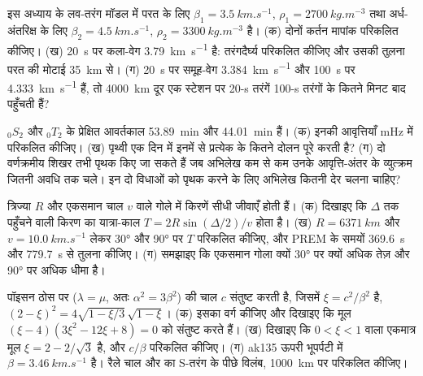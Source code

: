 \begin{exercise}[$\star$]\label{exo:b3:seismology-imaging:3}
इस अध्याय के लव-तरंग मॉडल में परत के लिए $\beta_1 =
\qty{3.5}{km.s^{-1}}$, $\rho_1 = \qty{2700}{kg.m^{-3}}$ तथा अर्ध-अंतरिक्ष के लिए
$\beta_2 = \qty{4.5}{km.s^{-1}}$, $\rho_2 = \qty{3300}{kg.m^{-3}}$ है।
(क) दोनों कर्तन मापांक परिकलित कीजिए। (ख) \qty{20}{s} पर कला-वेग
\qty{3.79}{km.s^{-1}} है: तरंगदैर्घ्य परिकलित कीजिए और उसकी तुलना परत की
मोटाई \qty{35}{km} से। (ग) \qty{20}{s} पर समूह-वेग \qty{3.384}{km.s^{-1}} और
\qty{100}{s} पर \qty{4.333}{km.s^{-1}} हैं, तो \qty{4000}{km} दूर एक स्टेशन पर
20-s तरंगें 100-s तरंगों के कितने मिनट बाद पहुँचती हैं?
\end{exercise}

\begin{exercise}[$\star$]\label{exo:b3:seismology-imaging:4}
${}_0S_2$ और ${}_0T_2$ के प्रेक्षित आवर्तकाल \qty{53.89}{min} और
\qty{44.01}{min} हैं। (क) इनकी आवृत्तियाँ \unit{mHz} में परिकलित कीजिए। (ख) पृथ्वी
एक दिन में इनमें से प्रत्येक के कितने दोलन पूरे करती है? (ग) दो वर्णक्रमीय शिखर
तभी पृथक किए जा सकते हैं जब अभिलेख कम से कम उनके आवृत्ति-अंतर के व्युत्क्रम
जितनी अवधि तक चले। इन दो विधाओं को पृथक करने के लिए अभिलेख कितनी देर चलना चाहिए?
\end{exercise}

\begin{exercise}[$\star\star$]\label{exo:b3:seismology-imaging:5}
त्रिज्या $R$ और एकसमान चाल $v$ वाले गोले में किरणें सीधी जीवाएँ होती हैं।
(क) दिखाइए कि $\Delta$ तक पहुँचने वाली किरण का यात्रा-काल
$T = 2R\sin(\Delta/2)/v$ होता है। (ख) $R = \qty{6371}{km}$ और
$v = \qty{10.0}{km.s^{-1}}$ लेकर \ang{30} और \ang{90} पर $T$ परिकलित कीजिए, और
PREM के समयों \qty{369.6}{s} और \qty{779.7}{s} से तुलना कीजिए। (ग) समझाइए कि एकसमान गोला क्यों
\ang{30} पर क्यों अधिक तेज़ और \ang{90} पर अधिक धीमा है।
\end{exercise}

\begin{exercise}[$\star\star$]\label{exo:b3:seismology-imaging:6}
पॉइसन ठोस पर ($\lambda = \mu$, अतः $\alpha^2 = 3\beta^2$) 
की चाल $c$ संतुष्ट करती है, जिसमें $\xi = c^2/\beta^2$ है,
$(2 - \xi)^2 = 4\sqrt{1 - \xi/3}\,\sqrt{1 - \xi}$। (क) इसका वर्ग कीजिए और दिखाइए
कि मूल $(\xi - 4)(3\xi^2 - 12\xi + 8) = 0$ को संतुष्ट करते हैं। (ख) दिखाइए कि
$0 < \xi < 1$ वाला एकमात्र मूल $\xi = 2 - 2/\sqrt3$ है, और $c/\beta$ परिकलित कीजिए।
(ग) ak135 ऊपरी भूपर्पटी में $\beta = \qty{3.46}{km.s^{-1}}$ है। रैले चाल और
 का S-तरंग के पीछे विलंब,
\qty{1000}{km} पर परिकलित कीजिए।
\end{exercise}

